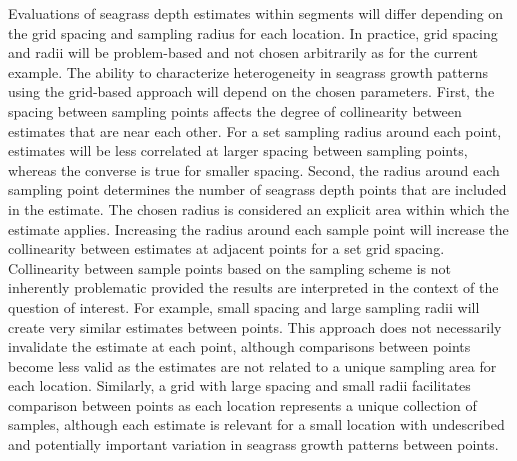 \documentclass[letterpaper,12pt,oneside]{article}\usepackage[]{graphicx}\usepackage[]{color}
\begin{document}
Evaluations of seagrass depth estimates within segments will differ depending on the grid spacing and sampling radius for each location.  In practice, grid spacing and radii will be problem-based and not chosen arbitrarily as for the current example.  The ability to characterize heterogeneity in seagrass growth patterns using the grid-based approach will depend on the chosen parameters.  First, the spacing between sampling points affects the degree of collinearity between estimates that are near each other.  For a set sampling radius around each point, estimates will be less correlated at larger spacing between sampling points, whereas the converse is true for smaller spacing.  Second, the radius around each sampling point determines the number of seagrass depth points that are included in the estimate.  The chosen radius is considered an explicit area within which the estimate applies.  Increasing the radius around each sample point will increase the collinearity between estimates at adjacent points for a set grid spacing.  Collinearity between sample points based on the sampling scheme is not inherently problematic provided the results are interpreted in the context of the question of interest.  For example, small spacing and large sampling radii will create very similar estimates between points.  This approach does not necessarily invalidate the estimate at each point, although comparisons between points become less valid as the estimates are not related to a unique sampling area for each location.  Similarly, a grid with large spacing and small radii facilitates comparison between points as each location represents a unique collection of samples, although each estimate is relevant for a small location with undescribed and potentially important variation in seagrass growth patterns between points.  
\end{document}
